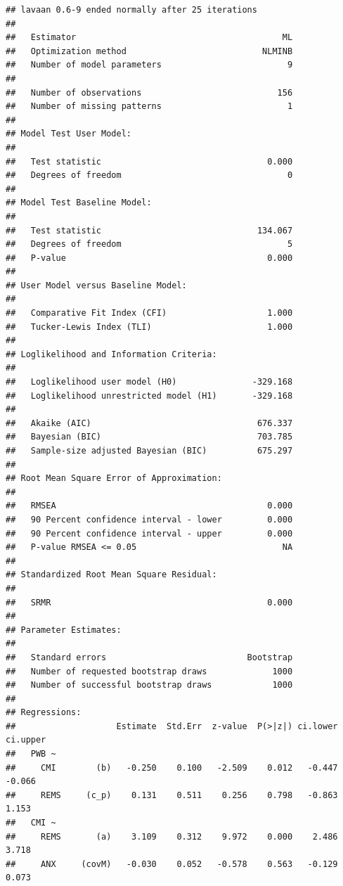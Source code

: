 \documentclass[
  11pt,
]{book}
\begin{document}
\begin{verbatim}
## lavaan 0.6-9 ended normally after 25 iterations
## 
##   Estimator                                         ML
##   Optimization method                           NLMINB
##   Number of model parameters                         9
##                                                       
##   Number of observations                           156
##   Number of missing patterns                         1
##                                                       
## Model Test User Model:
##                                                       
##   Test statistic                                 0.000
##   Degrees of freedom                                 0
## 
## Model Test Baseline Model:
## 
##   Test statistic                               134.067
##   Degrees of freedom                                 5
##   P-value                                        0.000
## 
## User Model versus Baseline Model:
## 
##   Comparative Fit Index (CFI)                    1.000
##   Tucker-Lewis Index (TLI)                       1.000
## 
## Loglikelihood and Information Criteria:
## 
##   Loglikelihood user model (H0)               -329.168
##   Loglikelihood unrestricted model (H1)       -329.168
##                                                       
##   Akaike (AIC)                                 676.337
##   Bayesian (BIC)                               703.785
##   Sample-size adjusted Bayesian (BIC)          675.297
## 
## Root Mean Square Error of Approximation:
## 
##   RMSEA                                          0.000
##   90 Percent confidence interval - lower         0.000
##   90 Percent confidence interval - upper         0.000
##   P-value RMSEA <= 0.05                             NA
## 
## Standardized Root Mean Square Residual:
## 
##   SRMR                                           0.000
## 
## Parameter Estimates:
## 
##   Standard errors                            Bootstrap
##   Number of requested bootstrap draws             1000
##   Number of successful bootstrap draws            1000
## 
## Regressions:
##                    Estimate  Std.Err  z-value  P(>|z|) ci.lower ci.upper
##   PWB ~                                                                 
##     CMI        (b)   -0.250    0.100   -2.509    0.012   -0.447   -0.066
##     REMS     (c_p)    0.131    0.511    0.256    0.798   -0.863    1.153
##   CMI ~                                                                 
##     REMS       (a)    3.109    0.312    9.972    0.000    2.486    3.718
##     ANX     (covM)   -0.030    0.052   -0.578    0.563   -0.129    0.073

\end{verbatim}
\end{document}
